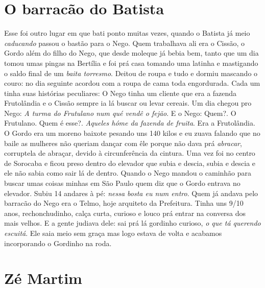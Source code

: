 \documentclass[12pt,brazil,]{book}
\begin{document}
\section{O barracão do Batista}\label{o-barracuxe3o-do-batista}

Esse foi outro lugar em que bati ponto muitas vezes, quando o Batista já
meio \emph{caducando} passou o bastão para o Nego. Quem trabalhava ali
era o Cissão, o Gordo além do filho do Nego, que desde moleque já bebia
bem, tanto que um dia tomou umas pingas na Bertília e foi prá casa
tomando uma latinha e mastigando o saldo final de um \emph{baita
torresmo}. Deitou de roupa e tudo e dormiu mascando o couro: no dia
seguinte acordou com a roupa de cama toda engordurada. Cada um tinha
suas histórias peculiares: O Nego tinha um cliente que era a fazenda
Frutolândia e o Cissão sempre ia lá buscar ou levar cereais. Um dia
chegou pro Nego: \emph{A turma do Frutulano num qué vendê o fejão}. E o
Nego: Quem?. O Frutulano. Quem é esse?. \emph{Aqueles hóme da fazenda de
fruita}. Era a Frutolândia. O Gordo era um moreno baixote pesando uns
140 kilos e eu zuava falando que no baile as mulheres não queriam dançar
com êle porque não dava prá \emph{abracar}, corruptela de abraçar,
devido à circunferência da cintura. Uma vez foi no centro de Sorocaba e
ficou preso dentro do elevador que subia e descia, subia e descia e ele
não sabia como sair lá de dentro. Quando o Nego mandou o caminhão para
buscar umas coisas minhas em São Paulo quem diz que o Gordo entrava no
elevador. Subiu 14 andares à pé: \emph{nessa bosta eu num entro}. Quem
já andava pelo barracão do Nego era o Telmo, hoje arquiteto da
Prefeitura. Tinha uns 9/10 anos, rechonchudinho, calça curta, curioso e
louco prá entrar na conversa dos mais velhos. E a gente judiava dele:
sai prá lá gordinho curioso, \emph{o que tá querendo escuitá}. Ele saia
meio sem graça mas logo estava de volta e acabamos incorporando o
Gordinho na roda.

\section{Zé Martim}\label{zuxe9-martim}
\end{document}
